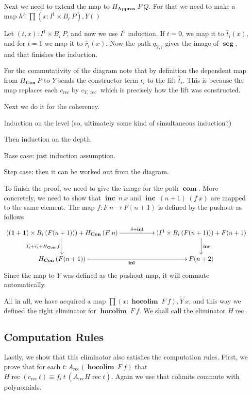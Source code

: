 \documentclass[a4paper,UKenglish]{lipics-v2016}
\newcommand{\one}[0]{\textbf{1}}
\newcommand{\frec}[0]{\!\operatorname{rec}}
\newcommand{\rec}[0]{\operatorname{rec}}
\newcommand{\Con}[0]{\textbf{Con}}
\newcommand{\Approx}[0]{\textbf{Approx}}
\newcommand{\hocolim}[0]{\operatorname{\textbf{hocolim}}}
\newcommand{\seg}[0]{\operatorname{\textbf{seg}}}
\newcommand{\inl}[0]{\operatorname{\textbf{inl}}}
\newcommand{\inr}[0]{\operatorname{\textbf{inr}}}
\newcommand{\inc}[0]{\operatorname{\textbf{inc}}}
\newcommand{\com}[0]{\operatorname{\textbf{com}}}
\newcommand{\dak}[1]{\widehat{#1}}
\newcommand{\hatt}{\dak{t}}
\newcommand{\hatr}{\dak{r}}
\begin{document}
Next we need to extend the map to $H_{\Approx} \> P \> Q$.
For that we need to make a map $h' : \prod (x : I^1 \times B_i \> P), Y()$

Let $(t, x) : I^1 \times B_i \> P$, and now we use $I^1$ induction.
If $t = 0$, we map it to $\hatt_i (x)$, and for $t = 1$ we map it to $\hatr_i (x)$.
Now the path $q_{Y, i}$ gives the image of $\seg$, and that finishes the induction.

For the commutativity of the diagram note that by definition the dependent map from $H_{\Con} \> P$ to $Y$ sends the constructor term $t_i$ to the lift $\hatt_i$.
This is because the map replaces each $c_{\rec}$ by $c_{Y, \rec}$ which is precisely how the lift was constructed.


Next we do it for the coherency.

Induction on the level (so, ultimately some kind of simultaneous induction?)

Then induction on the depth.

Base case: just induction assumption.

Step case: then it can be worked out from the diagram.



To finish the proof, we need to give the image for the path $\com$.
More concretely, we need to show that $\inc \> n \> x$ and $\inc \> (n+1) \> (f \> x)$ are mapped to the same element.
The map $f : F \> n \rightarrow F(n + 1)$ is defined by the pushout as follows
\[
\xymatrix
{
	((\one + \one) \times B_i \> (F(n+1))) + H_{\Con} \>  (F \> n) \ar[d]_{\overline{t_i} + \overline{r_i} + H_{\Con} \> f} \ar[rr]^-{\delta + \inl} & & (I^1 \times B_i \> (F(n+1))) + F(n+1)  \ar[d]^{\inr}\\
	H_{\Con} \> (F(n+1)) \ar[rr]_{\inl} & & F(n+2)
}
\]
Since the map to $Y$ was defined as the pushout map, it will commute automatically.

All in all, we have acquired a map $\prod (x : \hocolim \> F \> f), Y \> x$, and this way we defined the right eliminator for $\hocolim \> F \> f$.
We shall call the eliminator $H\frec$.

\subsection{Computation Rules}
Lastly, we show that this eliminator also satisfies the computation rules.
First, we prove that for each $t : A_{\rec}(\hocolim \> F \> f)$ that $H\frec(c_{\rec} \> t) \equiv f_i \> t \> (\overline{A_{\rec}} H\frec t)$.
Again we use that colimits commute with polynomials.
\end{document}
